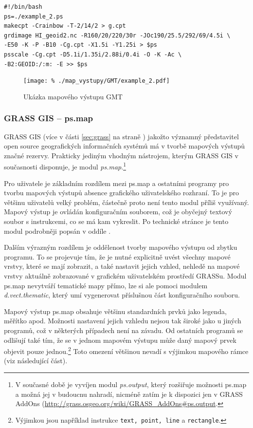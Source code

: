 \documentclass[a4paper,12pt,draft]{article}
\newcommand{\modul}[1]{\emph{#1}}
\newcommand{\instr}[1]{\lstinline[style=psmapInline]|#1|}
\begin{document}
\begin{lstlisting}[style=script]
#!/bin/bash
ps=./example_2.ps
makecpt -Crainbow -T-2/14/2 > g.cpt
grdimage HI_geoid2.nc -R160/20/220/30r -JOc190/25.5/292/69/4.5i \
-E50 -K -P -B10 -Cg.cpt -X1.5i -Y1.25i > $ps
psscale -Cg.cpt -D5.1i/1.35i/2.88i/0.4i -O -K -Ac \
-B2:GEOID:/:m: -E >> $ps
\end{lstlisting}


\begin{figure}[h!]
\centering
\texttt{[image: \%
./map\_vystupy/GMT/example\_2.pdf]}
  \caption{Ukázka mapového výstupu GMT}
  \label{fig:gmt}
\end{figure}



\subsubsection{GRASS GIS -- ps.map}
\label{sec:porovnani:psmap}
GRASS GIS (více v části \ref{sec:grass} na straně \pageref{sec:grass})
jakožto významný představitel open source geografických informačních
systémů má v tvorbě mapových výstupů značné rezervy. Prakticky
jediným vhodným nástrojem, kterým GRASS GIS v současnosti disponuje,
je modul \modul{ps.map}.\footnote{V současné době je vyvíjen modul
\modul{ps.output}, který rozšiřuje možnosti ps.map a možná
jej v budoucnu nahradí, nicméně zatím je k dispozici jen v GRASS AddOns
(\url{http://grass.osgeo.org/wiki/GRASS_AddOns\#ps.output}.}

Pro uživatele je základním rozdílem mezi ps.map a ostatními
programy pro tvorbu mapových výstupů  absence grafického uživatelského
rozhraní. To je pro většinu uživatelů velký problém, částečně
proto není tento modul příliš využívaný. Mapový výstup je ovládán
konfiguračním souborem, což je obyčejný textový soubor s instrukcemi,
co se má kam vykreslit. Po technické stránce je tento modul podrobněji
popsán v oddíle \nameref{sec:psmap}.

Dalším výrazným rozdílem je oddělenost tvorby mapového výstupu od
zbytku programu. To se projevuje tím, že je nutné explicitně uvést
všechny mapové vrstvy, které se mají zobrazit, a také nastavit jejich
vzhled, nehledě na mapové vrstvy aktuálně zobrazované  v grafickém
uživatelském prostředí GRASSu. Modul ps.map nevytváří
tematické mapy přímo, lze si ale pomoci modulem \emph{d.vect.thematic},
který umí vygenerovat příslušnou část konfiguračního souboru.

Mapový výstup ps.map obsahuje většinu standardních prvků jako
legenda, měřítko apod. Možnosti nastavení jejich vzhledu nejsou tak
široké jako u jiných programů, což v některých případech není na závadu. Od
ostatních programů se odlišují také tím, že se v jednom mapovém výstupu může
daný mapový prvek objevit pouze jednou.\footnote{Výjimkou jsou například
instrukce \instr{text, point, line} a \instr{rectangle}.} Toto omezení většinou
nevadí s výjimkou mapového rámce (viz následující část). 
\end{document}
